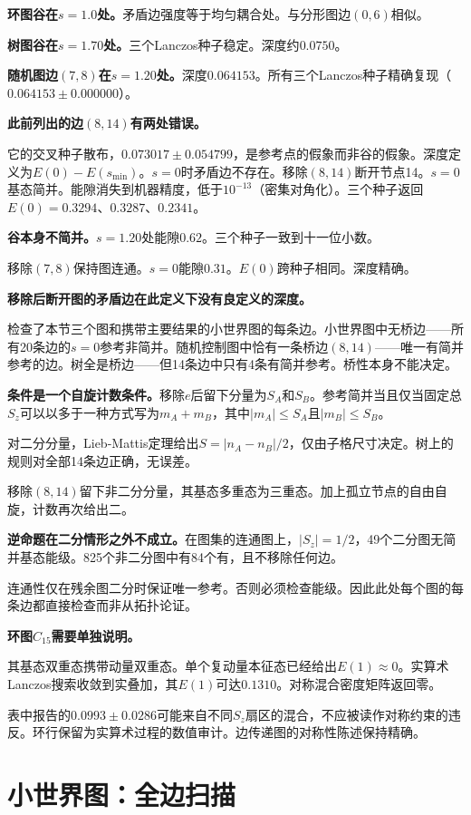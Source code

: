 \documentclass[11pt,a4paper]{book}
\theoremstyle{definition}
\begin{document}
\textbf{环图谷在$s=1.0$处。}矛盾边强度等于均匀耦合处。与分形图边$(0,6)$相似。

\textbf{树图谷在$s=1.70$处。}三个Lanczos种子稳定。深度约$0.0750$。

\textbf{随机图边$(7,8)$在$s=1.20$处。}深度$0.064153$。所有三个Lanczos种子精确复现（$0.064153\pm0.000000$）。

\textbf{此前列出的边$(8,14)$有两处错误。}

它的交叉种子散布，$0.073017\pm0.054799$，是参考点的假象而非谷的假象。深度定义为$E(0)-E(s_{\min})$。$s=0$时矛盾边不存在。移除$(8,14)$断开节点14。$s=0$基态简并。能隙消失到机器精度，低于$10^{-13}$（密集对角化）。三个种子返回$E(0)=0.3294$、$0.3287$、$0.2341$。

\textbf{谷本身不简并。}$s=1.20$处能隙$0.62$。三个种子一致到十一位小数。

移除$(7,8)$保持图连通。$s=0$能隙$0.31$。$E(0)$跨种子相同。深度精确。

\textbf{移除后断开图的矛盾边在此定义下没有良定义的深度。}

检查了本节三个图和携带主要结果的小世界图的每条边。小世界图中无桥边——所有20条边的$s=0$参考非简并。随机控制图中恰有一条桥边$(8,14)$——唯一有简并参考的边。树全是桥边——但14条边中只有4条有简并参考。桥性本身不能决定。

\textbf{条件是一个自旋计数条件。}移除$e$后留下分量为$S_A$和$S_B$。参考简并当且仅当固定总$S_z$可以以多于一种方式写为$m_A+m_B$，其中$|m_A|\le S_A$且$|m_B|\le S_B$。

对二分分量，Lieb-Mattis定理给出$S=|n_A-n_B|/2$，仅由子格尺寸决定。树上的规则对全部14条边正确，无误差。

移除$(8,14)$留下非二分分量，其基态多重态为三重态。加上孤立节点的自由自旋，计数再次给出二。

\textbf{逆命题在二分情形之外不成立。}在图集的连通图上，$|S_z|=1/2$，49个二分图无简并基态能级。825个非二分图中有84个有，且不移除任何边。

连通性仅在残余图二分时保证唯一参考。否则必须检查能级。因此此处每个图的每条边都直接检查而非从拓扑论证。

\textbf{环图$C_{15}$需要单独说明。}

其基态双重态携带动量双重态。单个复动量本征态已经给出$E(1)\approx0$。实算术Lanczos搜索收敛到实叠加，其$E(1)$可达$0.1310$。对称混合密度矩阵返回零。

表中报告的$0.0993\pm0.0286$可能来自不同$S_z$扇区的混合，不应被读作对称约束的违反。环行保留为实算术过程的数值审计。边传递图的对称性陈述保持精确。

\section{小世界图：全边扫描}
\end{document}
